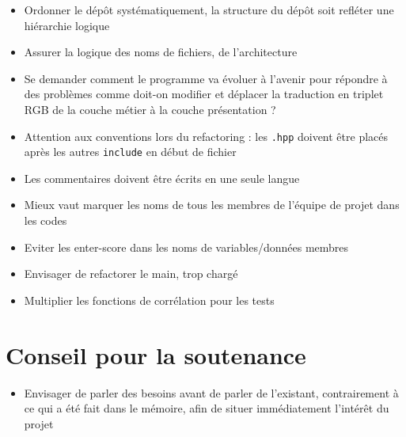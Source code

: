 \documentclass[a4paper]{article}
\begin{document}
\begin{itemize}

	\item Ordonner le dépôt systématiquement, la structure du dépôt soit refléter une
	      hiérarchie logique
	\item Assurer la logique des noms de fichiers, de l'architecture
	\item Se demander comment le programme va évoluer à l'avenir pour répondre à des
	      problèmes comme doit-on modifier et déplacer la traduction en triplet RGB de la
	      couche métier à la couche présentation ?
	\item Attention aux conventions lors du refactoring : les \verb!.hpp! doivent être placés après les autres \verb!include! en début de fichier
	\item Les commentaires doivent être écrits en une seule langue
	\item Mieux vaut marquer les noms de tous les membres de l'équipe de projet dans les codes
	\item Eviter les enter-score dans les noms de variables/données membres
	\item Envisager de refactorer le main, trop chargé
	\item Multiplier les fonctions de corrélation pour les tests

\end{itemize}




\section{Conseil pour la soutenance}

\begin{itemize}

	\item Envisager de parler des besoins avant de parler de l'existant, contrairement à ce qui a été fait dans le mémoire, afin de situer immédiatement l'intérêt du projet
\end{itemize}
\end{document}
